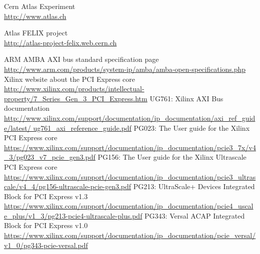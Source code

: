 \begin{thebibliography}{9}
  Cern Atlas Experiment\\
  \href{http://www.atlas.ch}{http://www.atlas.ch}

Atlas FELIX project\\
\href{http://atlas-project-felix.web.cern.ch}{http://atlas-project-felix.web.cern.ch}


  ARM AMBA AXI bus standard specification page\\
  \href{http://www.arm.com/products/system-ip/amba/amba-open-specifications.php}{http://www.arm.com/products/system-ip/amba/amba-open-specifications.php}
  Xilinx website about the PCI Express core\\
  \href{http://www.xilinx.com/products/intellectual-property/7_Series_Gen_3_PCI_Express.htm}{http://www.xilinx.com/products/intellectual-property/7\_Series\_Gen\_3\_PCI\_Express.htm}
  UG761: Xilinx AXI Bus documentation\\
  \href{http://www.xilinx.com/support/documentation/ip_documentation/axi_ref_guide/latest/ug761_axi_reference_guide.pdf}{http://www.xilinx.com/support/documentation/ip\_documentation/axi\_ref\_guide/latest/ ug761\_axi\_reference\_guide.pdf}
  PG023: The User guide for the Xilinx PCI Express core\\
  \href{https://www.xilinx.com/support/documentation/ip\_documentation/pcie3\_7x/v4\_3/pg023\_v7\_pcie\_gen3.pdf}{https://www.xilinx.com/support/documentation/ip\_documentation/pcie3\_7x/v4\_3/pg023\_v7\_pcie\_gen3.pdf}
PG156: The User guide for the Xilinx Ultrascale PCI Express core \\
\href{https://www.xilinx.com/support/documentation/ip\_documentation/pcie3\_ultrascale/v4\_4/pg156-ultrascale-pcie-gen3.pdf}{https://www.xilinx.com/support/documentation/ip\_documentation/pcie3\_ultrascale/v4\_4/pg156-ultrascale-pcie-gen3.pdf}
PG213: UltraScale+ Devices Integrated Block for PCI Express v1.3 \href{https://www.xilinx.com/support/documentation/ip\_documentation/pcie4\_uscale\_plus/v1\_3/pg213-pcie4-ultrascale-plus.pdf}{https://www.xilinx.com/support/documentation/ip\_documentation/pcie4\_uscale\_plus/v1\_3/pg213-pcie4-ultrascale-plus.pdf}
PG343: Versal ACAP Integrated Block for PCI Express v1.0
\href{https://www.xilinx.com/support/documentation/ip\_documentation/pcie\_versal/v1\_0/pg343-pcie-versal.pdf}{https://www.xilinx.com/support/documentation/ip\_documentation/pcie\_versal/v1\_0/pg343-pcie-versal.pdf}

\end{thebibliography}
